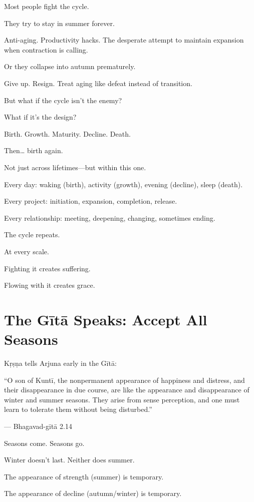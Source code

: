 \documentclass[11pt,twoside]{book}
\begin{document}
Most people fight the cycle.

They try to stay in summer forever.

Anti-aging. Productivity hacks. The desperate attempt to maintain expansion when contraction is calling.

Or they collapse into autumn prematurely.

Give up. Resign. Treat aging like defeat instead of transition.

But what if the cycle isn't the enemy?

What if it's the design?

Birth. Growth. Maturity. Decline. Death.

Then\ldots{} birth again.

Not just across lifetimes—but within this one.

Every day: waking (birth), activity (growth), evening (decline), sleep (death).

Every project: initiation, expansion, completion, release.

Every relationship: meeting, deepening, changing, sometimes ending.

The cycle repeats.

At every scale.

Fighting it creates suffering.

Flowing with it creates grace.

\section*{The Gītā Speaks: Accept All Seasons}

Kṛṣṇa tells Arjuna early in the Gītā:

\begin{pullquote}
``O son of Kuntī, the nonpermanent appearance of happiness and distress, and their disappearance in due course, are like the appearance and disappearance of winter and summer seasons. They arise from sense perception, and one must learn to tolerate them without being disturbed.''

--- Bhagavad-gītā 2.14
\end{pullquote}

Seasons come. Seasons go.

Winter doesn't last. Neither does summer.

The appearance of strength (summer) is temporary.

The appearance of decline (autumn/winter) is temporary.
\end{document}
